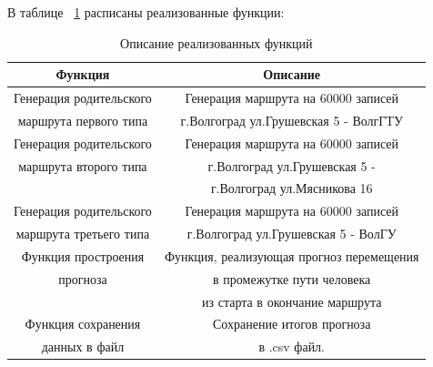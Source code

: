 \documentclass[a4paper,english]{G2-105}
\begin{document}
	\par В таблице ~\ref{function} расписаны реализованные функции:
	\begin{longtable}{|c|c|}
		\caption {Описание реализованных функций} \label{function} \\ \hline
		    Функция 				&	 Описание 		        \\ \hline \endhead
		   Генерация  родительского	&Генерация маршрута на 60000  записей 	         \\ 
		   маршрута первого типа	& г.Волгоград ул.Грушевская 5 - ВолгГТУ \\ \hline
		   Генерация  родительского	&Генерация маршрута на 60000  записей 	         \\ 
		   маршрута второго типа	& г.Волгоград ул.Грушевская 5 - \\
		   					& г.Волгоград ул.Мясникова 16 \\ \hline
		   Генерация  родительского	&Генерация маршрута на 60000  записей 	         \\ 
		   маршрута третьего типа	& г.Волгоград ул.Грушевская 5 - ВолГУ \\ \hline
		   Функция простроения		&Функция, реализующая прогноз перемещения \\
		   прогноза		 		&в промежутке пути человека \\
		   					&из старта в окончание маршрута \\ 	\hline
		   Функция сохранения 		&Сохранение итогов прогноза         \\	
		   данных в файл	 		&в .csv файл.      	         \\ 	\hline
	\end{longtable}
\end{document}
